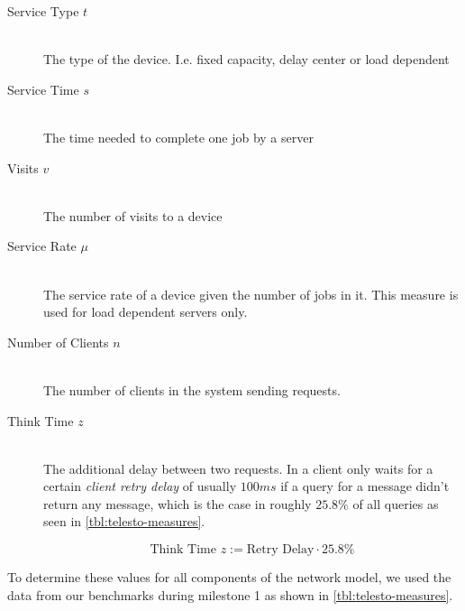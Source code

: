\documentclass[a4paper, oneside]{csthesis}
\begin{document}
    \begin{description}
        \item[Service Type $t$] \ \\
            The type of the device. I.e. fixed capacity, delay center or load
            dependent
        \item[Service Time $s$] \ \\
            The time needed to complete one job by a server
        \item[Visits $v$] \ \\
            The number of visits to a device
        \item[Service Rate $\mu$] \ \\
            The service rate of a device given the number of jobs in it.
            This measure is used for load dependent servers only.
        \item[Number of Clients $n$] \ \\
            The number of clients in the system sending requests.
        \item[Think Time $z$] \ \\
            The additional delay between two requests. In \telesto{} a client
            only waits for a certain {\it client retry delay} of usually $100
            ms$ if a query for a message didn't return any message, which is
            the case in roughly $25.8 \%$ of all queries as seen in
            \cref{tbl:telesto-measures}.
            
            \[
                \text{Think Time } z := \text{Retry Delay} \cdot 25.8\%
            \]
            
    \end{description}


    To determine these values for all components of the network model, we used
    the data from our benchmarks during milestone 1 as shown in
    \cref{tbl:telesto-measures}.
\end{document}
